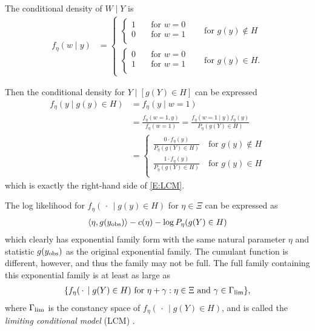 The conditional density of $W \mid Y$ is
\begin{align*}
	f_\eta(w \mid y) &= \begin{cases}
 			\begin{cases}
			1 	\quad &\text{for $w=0$}\\
			0 	\quad &\text{for $w=1$}\\
			\end{cases} \quad &\text{for } g(y) \notin H\\
 			\begin{cases}
			0 	\quad &\text{for $w=0$}\\
			1 	\quad &\text{for $w=1$}\\
			\end{cases} \quad &\text{for } g(y) \in H.
 		\end{cases}
\end{align*}

Then the conditional density for $Y \mid [g(Y)\in H]$ can be expressed
\begin{align*}
	f_\eta(y \mid g(y) \in H) &= f_\eta(y \mid w=1) \\
					&= \frac{f_\eta(w=1, y)}{f_\eta(w=1)}	
					= \frac{f_\eta(w=1 \mid y) f_\eta(y)}{P_\eta(g(Y) \in H)}  \\%
	&= \begin{cases}
 			\frac{0 \cdot f_\eta(y)}{P_\eta(g(Y) \in H)}   \quad 
					 \text{for $g(y) \notin H$}	\\
 			\frac{1 \cdot f_\eta(y)}{P_\eta(g(Y) \in H)}   \quad 
					 \text{for $g(y) \in H$}	\\
 		\end{cases}
\end{align*}
which is exactly the right-hand side of \eqref{E:LCM}.

The log likelihood for $f_\eta( \, \cdot\,  \mid g(y) \in H)$ for $\eta \in \Xi$ can be expressed as
\begin{align*}
	\langle \eta, g(y_{\text{obs}}) \rangle - c(\eta) - \log P_\eta(g(Y) \in H) 
\end{align*}
which clearly has exponential family form with the same natural parameter $\eta$ and 
statistic $g(y_{\text{obs}})$ as the original exponential family.  The cumulant function is different,
however, and thus the family may not be full.  The full family containing this exponential family is at least as large as
\begin{align*}
\{ f_{\eta}(\, \cdot\,  \mid g(Y) \in H) \text{ for }  \eta + \gamma: \eta \in \Xi \text
{ and } \gamma \in \Gamma_{\textrm{lim}} \},
\end{align*}
where $\Gamma_{\textrm{lim}}$ is the constancy space of $f_{\eta}( \, \cdot\,  \mid g(Y) \in H)$,
and is called the \emph{limiting conditional model} (LCM) \citep{Geyer:gdor}.  

